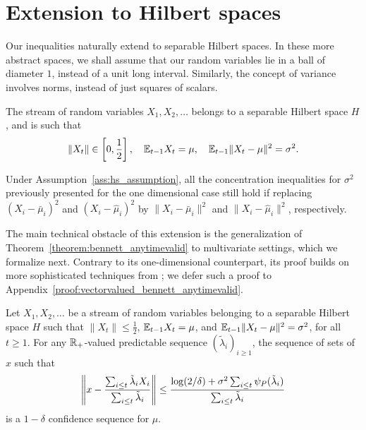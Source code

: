 

\section{Extension to Hilbert spaces} \label{section:extension_hs}


Our inequalities naturally extend to separable Hilbert spaces. In these more abstract spaces, we shall assume that our random variables lie in a ball of diameter $1$, instead of a unit long interval. Similarly, the concept of variance involves norms, instead of just squares of scalars. 
\begin{assumption} \label{ass:hs_assumption}
    The stream of random variables $X_1, X_2, \ldots$ belongs to a separable Hilbert space $H$, and is such that
    \begin{align*}
        \| X_t \| \in \left[ 0,\frac{1}{2} \right], \quad \mathbb{E}_{t-1} X_t = \mu, \quad \mathbb{E}_{t-1} \| X_t - \mu \|^2 = \sigma^2.
    \end{align*}
\end{assumption}
Under Assumption~\ref{ass:hs_assumption}, all the concentration inequalities for $\sigma^2$ previously presented for the one dimensional case still hold if replacing  $(X_i - \bar\mu_i)^2$ and $(X_i - \widehat\mu_i)^2$ by $\|X_i - \bar\mu_i\|^2$ and $\|X_i - \widehat\mu_i\|^2$, respectively. 


The main technical obstacle of this extension is the generalization of Theorem~\ref{theorem:bennett_anytimevalid} to multivariate settings, which we formalize next. Contrary to its one-dimensional counterpart, its proof builds on more sophisticated techniques from \citet{pinelis1994optimum}; we defer such a proof to
Appendix~\ref{proof:vectorvalued_bennett_anytimevalid}. %

\begin{theorem}  \label{theorem:vectorvalued_bennett_anytimevalid}
    Let $X_1, X_2, \ldots$ be a stream of random variables belonging to a separable Hilbert space $H$ such that $\| X_t \| \leq \frac{1}{2}$, $\mathbb{E}_{t-1}X_t = \mu$, and $\mathbb{E}_{t-1} \| X_t-\mu\|^2 = \sigma^2$, for all $t \geq 1$. For any $\mathbb{R}_+$-valued predictable sequence $(\tilde\lambda_i)_{i \geq 1}$, the sequence of sets of $x$ such that
     \begin{align*}
         \left\| x - \frac{\sum_{i \leq t} \tilde \lambda_i X_i}{\sum_{i \leq t} \tilde \lambda_i}\right\|  \leq \frac{\log(2/\delta) + \sigma^2\sum_{i \leq t} \psi_P(\tilde \lambda_i)}{\sum_{i \leq t} \tilde \lambda_i} 
     \end{align*}
     is a $1-\delta$ confidence sequence for $\mu$.
\end{theorem}


